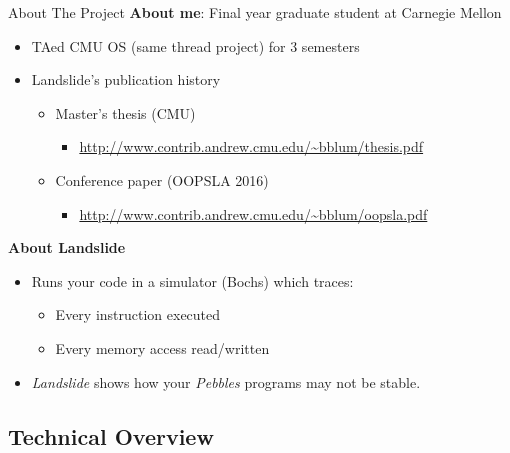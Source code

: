 \documentclass[xcolor=dvipsnames]{beamer}
\begin{document}
\begin{frame}{About The Project}
	\textbf{About me}: Final year graduate student at Carnegie Mellon
	\begin{itemize}
		\item TAed CMU OS (same thread project) for 3 semesters %
		\item Landslide's publication history
		\begin{itemize}
			\item Master's thesis (CMU)
			\begin{itemize}
				\item \url{http://www.contrib.andrew.cmu.edu/~bblum/thesis.pdf}
			\end{itemize}
			\item Conference paper (OOPSLA 2016)
			\begin{itemize}
				\item \url{http://www.contrib.andrew.cmu.edu/~bblum/oopsla.pdf}
			\end{itemize}
		\end{itemize}
	\end{itemize}
	\pause
	\linegap

	{\bf About Landslide}
	\begin{itemize}
		\item Runs your code in a simulator (Bochs) which traces:
			\begin{itemize}
				\item Every instruction executed
				\item Every memory access read/written
			\end{itemize}
		\item {\em Landslide} shows how your {\em Pebbles} programs may not be stable.
	\end{itemize}
\end{frame}


\subsection{Technical Overview}
\end{document}
